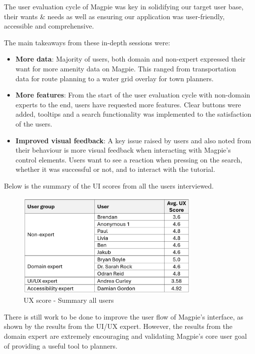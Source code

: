 The user evaluation cycle of Magpie was key in solidifying our target user base,
their wants \& needs as well as ensuring our application was user-friendly,
accessible and comprehensive.

The main takeaways from these in-depth sessions were:
\begin{itemize}
    \item \textbf{More data}: Majority of users, both domain and non-expert
          expressed their want for more amenity data on Magpie. This ranged from
          transportation data for route planning to a water grid overlay for town
          planners.

    \item \textbf{More features}: From the start of the user evaluation cycle
          with non-domain experts to the end, users have requested more features.
          Clear buttons were added, tooltips and a search functionality was
          implemented to the satisfaction of the users.

    \item \textbf{Improved visual feedback}: A key issue raised by users and
          also noted from their behaviour is more visual feedback when interacting
          with Magpie's control elements. Users want to see a reaction when pressing
          on the search, whether it was successful or not, and to interact with the tutorial.
\end{itemize}

Below is the summary of the UI scores from all the users interviewed.

\begin{figure}[htbp]
    \centering
    \includegraphics[width=0.8\textwidth]{images/ux-score-summary.png}
    \caption{UX score - Summary all users}
\end{figure}

There is still work to be done to improve the user flow of Magpie's interface,
as shown by the results from the UI/UX expert. However, the results from the
domain expert are extremely encouraging and validating Magpie's core user goal of
providing a useful tool to planners.

\newpage{}